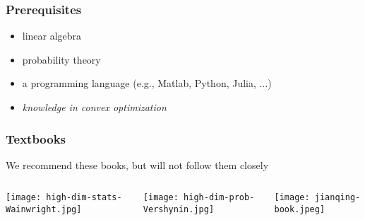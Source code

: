 \documentclass[compress,
mathserif,wide,%
]{beamer}
\begin{document}
\begin{frame}
\frametitle{Prerequisites}



\begin{itemize}
  \itemsep0.5em
  \item linear algebra 
  \item probability theory
  \item a programming language (e.g., Matlab, Python, Julia, $\ldots$)
  \item {\em knowledge in convex optimization}
\end{itemize}



\end{frame}


\begin{frame}
\frametitle{Textbooks}

We recommend these  books, but will not follow them closely

\begin{columns}
  \begin{column}{0.32\textwidth}
  \begin{center}
    \texttt{[image: high-dim-stats-Wainwright.jpg]}
  \end{center}


  \end{column} 

  \begin{column}{0.32\textwidth}
  \begin{center}
     \texttt{[image: high-dim-prob-Vershynin.jpg]}
  \end{center}

  \end{column}

  \begin{column}{0.32\textwidth}
  \begin{center}

    \texttt{[image: jianqing-book.jpeg]}
  \end{center} 

  \end{column} 


\end{columns}

\end{frame}
\end{document}
